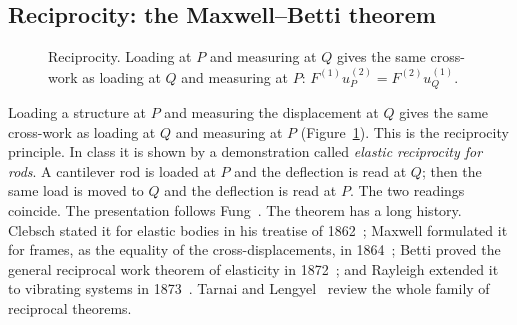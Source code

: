 \subsection{Reciprocity: the Maxwell--Betti theorem}\label{ssec:reciprocity}
%
\begin{figure}[h]
\centering
{}
\caption{Reciprocity. Loading at $P$ and measuring at $Q$ gives the same
cross-work as loading at $Q$ and measuring at $P$:
$F^{(1)}u^{(2)}_P=F^{(2)}u^{(1)}_Q$.}
\label{fig:reciprocity}
\end{figure}
Loading a structure at $P$ and measuring the displacement at $Q$ gives the
same cross-work as loading at $Q$ and measuring at $P$
(Figure~\ref{fig:reciprocity}). This is the reciprocity principle. In class
it is shown by a demonstration called \emph{elastic reciprocity for rods}. A
cantilever rod is loaded at $P$ and the deflection is read at $Q$; then the
same load is moved to $Q$ and the deflection is read at $P$. The two readings
coincide. The presentation follows Fung~\cite{Fung1965}. The theorem has a
long history. Clebsch stated it for elastic
bodies in his treatise of 1862~\cite{Clebsch1862}; Maxwell formulated it for
frames, as the equality of the cross-displacements, in 1864~\cite{Maxwell1864};
Betti proved the general reciprocal work theorem of elasticity in
1872~\cite{Betti1872}; and Rayleigh extended it to vibrating systems in
1873~\cite{Rayleigh1873}. Tarnai and Lengyel~\cite{TarnaiLengyel2007} review
the whole family of reciprocal theorems.

